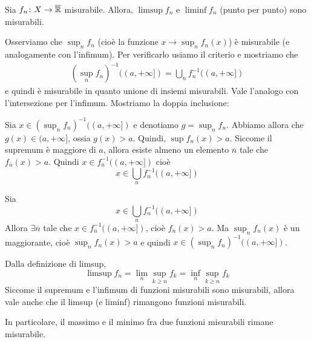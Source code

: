 \documentclass[a4paper]{article}
\begin{document}
\begin{radioactive}
\begin{snippetproposition}{}
    Sia \(f_n \colon X \to \overline {\mathbb{R}}\) misurabile.
    Allora, \(\limsup f_n\) e \(\liminf f_n\) (punto per punto) sono misurabili.
\end{snippetproposition}
\end{radioactive}

\begin{radioactive}
\begin{snippetproof}{}
    Osserviamo che \(\sup_n f_n\) (cioè la funzione \(x \to \sup_n f_n(x)\))
    è misurabile (e analogamente con l'infimum).
    Per verificarlo usiamo il criterio e mostriamo che
    \begin{align*}
        (\sup_n f_n)^{-1}((a, +\infty])
        = \bigcup_n f^{-1}_n ((a, +\infty])
    \end{align*}
    e quindi è misurabile in quanto unione di insiemi misurabili.
    Vale l'analogo con l'intersezione per l'infimum.
    Mostriamo la doppia inclusione:
    \begin{doubleinclusion}
    \item Sia \(x \in (\sup_n f_n)^{-1}((a, +\infty])\) e denotiamo \(g = \sup_n f_n\).
        Abbiamo allora che \(g(x) \in (a,+\infty]\), ossia \(g(x) > a\).
        Quindi, \(\sup f_n(x) > a\).
        Siccome il supremum è maggiore di \(a\), allora esiste almeno un elemento
        \(\overline n\) tale che \(f_{\overline n}(x) > a\).
        Quindi \(x \in f_{\overline n}^{-1}((a, +\infty])\) cioè \[
            x \in \bigcup_n f^{-1}_n ((a, +\infty])
        \]
    \item Sia \[
            x \in \bigcup_n f^{-1}_n ((a, +\infty])
        \]
        Allora \(\exists \overline n\) tale che \(x \in f^{-1}_{\overline n}((a, +\infty])\),
        cioè \(f_{\overline n}(x) > a\).
        Ma \(\sup_n f_n(x)\) è un maggiorante, cioè \(\sup_n f_n(x)>a\) e quindi
        \(x \in (\sup_n f_n)^{-1}((a, +\infty])\).
    \end{doubleinclusion}
    Dalla definizione di limsup,
    \[
        \limsup f_n = \lim_n \sup_{k \geq n}
        f_k = \inf_n \sup_{k \geq n} f_k
    \]
    Siccome il supremum e l'infimum di funzioni misurabili sono misurabili, allora
    vale anche che il limsup (e liminf) rimangono funzioni misurabili.
\end{snippetproof}
\end{radioactive}

\begin{radioactive}
In particolare, il massimo e il minimo fra due funzioni misurabili rimane misurabile.
\end{radioactive}
\end{document}
